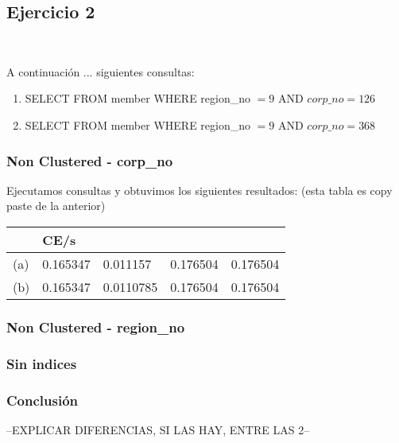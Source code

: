 \subsection{Ejercicio 2}\

A continuación ... siguientes consultas:
\begin{enumerate}[label=(\alph*)]
\item{SELECT \* FROM member WHERE region\_no $= 9$ AND $corp\_no = 126$}

\item{ SELECT \* FROM member WHERE region\_no $= 9$ AND $corp\_no = 368$}

\end{enumerate}

\subsubsection{Non Clustered - corp\_no}

Ejecutamos consultas y obtuvimos los siguientes resultados:
(esta tabla es copy paste de la anterior)
\begin{tabular}{| L | L | L | L | L |}
    \hline
     & CE/s &  &  &  \\ \hline
    (a) & 0.165347 & 0.011157 & 0.176504 & 0.176504 \\ \hline
    (b) & 0.165347 & 0.0110785 & 0.176504 & 0.176504 \\ \hline   
\end{tabular}
	
\subsubsection{Non Clustered - region\_no}
			
\subsubsection{Sin indices}	
			
			


\subsubsection{Conclusión}

--EXPLICAR DIFERENCIAS, SI LAS HAY, ENTRE LAS 2--